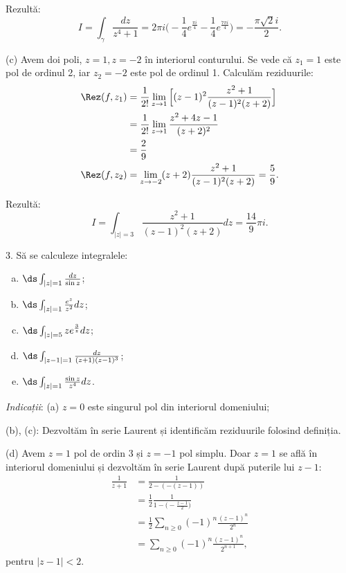 Rezultă:
\[
  I = \int_\gamma \frac{dz}{z^4 + 1} = %
  2 \pi i \Big( -\frac{1}{4} e^{\frac{\pi i}{4}} - \frac{1}{4} e^{\frac{7 \pi i}{4}} \Big) = %
  -\frac{\pi \sqrt{2} i}{2}.
\]

\vspace{1cm}

(c) Avem doi poli, $ z = 1, z = -2 $ în interiorul conturului. Se vede că $ z_1 = 1 $
este pol de ordinul 2, iar $ z_2 = -2 $ este pol de ordinul 1. Calculăm reziduurile:
\begin{align*}
  \Rez(f, z_1) &= \frac{1}{2!} \lim_{z \to 1} \Big[ (z - 1)^2 \frac{z^2 + 1}{(z - 1)^2(z + 2)} \Big] \\
               &= \frac{1}{2!} \lim_{z \to 1} \frac{z^2 + 4z - 1}{(z + 2)^2} \\
               &= \frac{2}{9} \\
  \Rez(f, z_2) &= \lim_{z \to -2} (z + 2) \frac{z^2 + 1}{(z - 1)^2(z + 2)} = \frac{5}{9}.
\end{align*}

Rezultă:
\[
  I = \int_{|z| = 3} \frac{z^2 + 1}{(z - 1)^2(z + 2)} dz = \frac{14}{9} \pi i.
\]

\vspace{1cm}

3. Să se calculeze integralele:
\begin{enumerate}[(a)]
\item $ \ds\int_{|z| = 1} \frac{dz}{\sin z} $;
\item $ \ds\int_{|z| = 1} \frac{e^z}{z^2}dz $;
\item $ \ds\int_{|z| = 5} z e^{\frac{3}{z}} dz $;
\item $ \ds\int_{|z - 1| = 1} \frac{dz}{(z + 1)(z - 1)^3} $;
\item $ \ds\int_{|z| = 1} \frac{\sin z}{z^4} dz $.
\end{enumerate}

\emph{Indicații}: (a) $ z = 0 $ este singurul pol din interiorul domeniului;

(b), (c): Dezvoltăm în serie Laurent și identificăm reziduurile folosind definiția.

(d) Avem $ z = 1 $ pol de ordin 3 și $ z = -1 $ pol simplu. Doar $ z = 1 $ se află
în interiorul domeniului și dezvoltăm în serie Laurent după puterile lui $ z - 1 $:
\begin{align*}
  \frac{1}{z + 1} &= \frac{1}{2 - (-(z - 1))} \\
                  &= \frac{1}{2} \frac{1}{1 - \big(-\frac{z - 1}{2}\big)} \\
                  &= \frac{1}{2} \sum_{n \geq 0} (-1)^n \frac{(z - 1)^n}{2^n} \\
                  &= \sum_{n \geq 0} (-1)^n \frac{(z - 1)^n}{2^{n+1}},
\end{align*}
pentru $ |z - 1| < 2 $.


